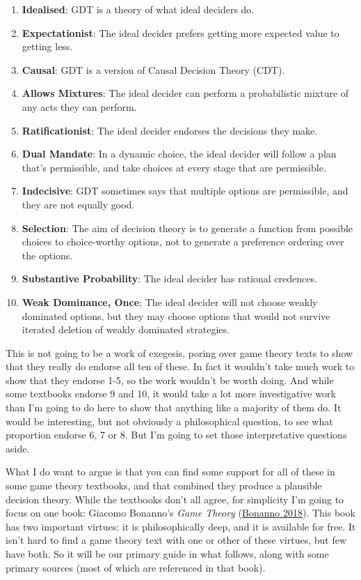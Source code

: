 \documentclass[
  12pt,
  letterpaper,
  DIV=11,
  numbers=noendperiod]{scrreprt}
\providecommand{\tightlist}{%
  \setlength{\itemsep}{0pt}\setlength{\parskip}{0pt}}\usepackage{longtable,booktabs,array}
\begin{document}
\begin{enumerate}
\def\labelenumi{\arabic{enumi}.}
\tightlist
\item
  \textbf{Idealised}: GDT is a theory of what ideal deciders do.
\item
  \textbf{Expectationist}: The ideal decider prefers getting more
  expected value to getting less.
\item
  \textbf{Causal}: GDT is a version of Causal Decision Theory (CDT).
\item
  \textbf{Allows Mixtures}: The ideal decider can perform a
  probabilistic mixture of any acts they can perform.
\item
  \textbf{Ratificationist}: The ideal decider endorses the decisions
  they make.
\item
  \textbf{Dual Mandate}: In a dynamic choice, the ideal decider will
  follow a plan that's permissible, and take choices at every stage that
  are permissible.
\item
  \textbf{Indecisive}: GDT sometimes says that multiple options are
  permissible, and they are not equally good.
\item
  \textbf{Selection}: The aim of decision theory is to generate a
  function from possible choices to choice-worthy options, not to
  generate a preference ordering over the options.
\item
  \textbf{Substantive Probability}: The ideal decider has rational
  credences.
\item
  \textbf{Weak Dominance, Once}; The ideal decider will not choose
  weakly dominated options, but they may choose options that would not
  survive iterated deletion of weakly dominated strategies.
\end{enumerate}

This is not going to be a work of exegesis, poring over game theory
texts to show that they really do endorse all ten of these. In fact it
wouldn't take much work to show that they endorse 1-5, so the work
wouldn't be worth doing. And while some textbooks endorse 9 and 10, it
would take a lot more investigative work than I'm going to do here to
show that anything like a majority of them do. It would be interesting,
but not obviously a philosophical question, to see what proportion
endorse 6, 7 or 8. But I'm going to set those interpretative questions
aside.

What I do want to argue is that you can find some support for all of
these in some game theory textbooks, and that combined they produce a
plausible decision theory. While the textbooks don't all agree, for
simplicity I'm going to focus on one book: Giacomo Bonanno's \emph{Game
Theory} (\protect\hyperlink{ref-Bonanno2018}{Bonanno 2018}). This book
has two important virtues: it is philosophically deep, and it is
available for free. It isn't hard to find a game theory text with one or
other of these virtues, but few have both. So it will be our primary
guide in what follows, along with some primary sources (most of which
are referenced in that book).
\end{document}
